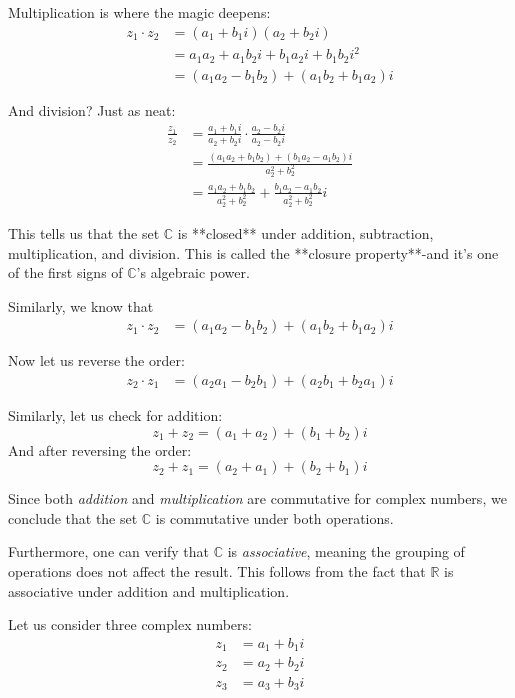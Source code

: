 Multiplication is where the magic deepens:
\begin{align*}
z_1 \cdot z_2 &= (a_1 + b_1 i)(a_2 + b_2 i) \\
&= a_1 a_2 + a_1 b_2 i + b_1 a_2 i + b_1 b_2 i^2 \\
&= (a_1 a_2 - b_1 b_2) + (a_1 b_2 + b_1 a_2)i
\end{align*}

And division? Just as neat:
\begin{align*}
\frac{z_1}{z_2} &= \frac{a_1 + b_1 i}{a_2 + b_2 i} \cdot \frac{a_2 - b_2 i}{a_2 - b_2 i} \\
&= \frac{(a_1 a_2 + b_1 b_2) + (b_1 a_2 - a_1 b_2)i}{a_2^2 + b_2^2} \\
&= \frac{a_1 a_2 + b_1 b_2}{a_2^2 + b_2^2} + \frac{b_1 a_2 - a_1 b_2}{a_2^2 + b_2^2}i
\end{align*}

This tells us that the set $\mathbb{C}$ is **closed** under addition, subtraction, multiplication, and division. This is called the **closure property**-and it’s one of the first signs of $\mathbb{C}$'s algebraic power.

Similarly, we know that
\begin{align*}
z_1 \cdot z_2 &= (a_1 a_2 - b_1 b_2) + (a_1 b_2 + b_1 a_2)i
\end{align*}

Now let us reverse the order:
\begin{align*}
z_2 \cdot z_1 &= (a_2 a_1 - b_2 b_1) + (a_2 b_1 + b_2 a_1)i
\end{align*}

Similarly, let us check for addition:
\[
z_1 + z_2 = (a_1 + a_2) + (b_1 + b_2)i
\]
And after reversing the order:
\[
z_2 + z_1 = (a_2 + a_1) + (b_2 + b_1)i
\]

Since both \emph{addition} and \emph{multiplication} are commutative for complex numbers, we conclude that the set $\mathbb{C}$ is commutative under both operations.

Furthermore, one can verify that $\mathbb{C}$ is \emph{associative}, meaning the grouping of operations does not affect the result. This follows from the fact that $\mathbb{R}$ is associative under addition and multiplication.

Let us consider three complex numbers:
\begin{align*}
z_1 &= a_1 + b_1 i \\
z_2 &= a_2 + b_2 i \\
z_3 &= a_3 + b_3 i
\end{align*}

